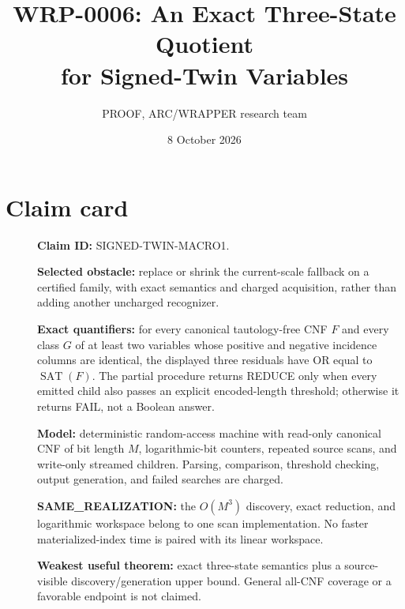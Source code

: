 \documentclass[11pt]{article}
\title{WRP-0006: An Exact Three-State Quotient\\for Signed-Twin Variables}
\author{PROOF, ARC/WRAPPER research team}
\date{8 October 2026}
\newcommand{\SAT}{\operatorname{SAT}}
\begin{document}
\maketitle

\begin{center}
\end{center}

\section{Claim card}
\begin{description}
\item[] \textbf{Claim ID:} SIGNED-TWIN-MACRO1.
\item[] \textbf{Selected obstacle:} replace or shrink the current-scale
fallback on a certified family, with exact semantics and charged acquisition,
rather than adding another uncharged recognizer.
\item[] \textbf{Exact quantifiers:} for every canonical tautology-free CNF
$F$ and every class $G$ of at least two variables whose positive and negative
incidence columns are identical, the displayed three residuals have OR equal
to $\SAT(F)$.  The partial procedure returns REDUCE only when every emitted
child also passes an explicit encoded-length threshold; otherwise it returns
FAIL, not a Boolean answer.
\item[] \textbf{Model:} deterministic random-access machine with read-only
canonical CNF of bit length $M$, logarithmic-bit counters, repeated source
scans, and write-only streamed children.  Parsing, comparison, threshold
checking, output generation, and failed searches are charged.
\item[] \textbf{SAME\_REALIZATION:} the $O(M^3)$ discovery, exact reduction,
and logarithmic workspace belong to one scan implementation.  No faster
materialized-index time is paired with its linear workspace.
\item[] \textbf{Weakest useful theorem:} exact three-state semantics plus a
source-visible discovery/generation upper bound.  General all-CNF coverage or
a favorable endpoint is not claimed.
\end{description}
\end{document}
